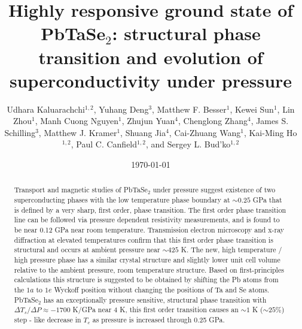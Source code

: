 \documentclass[aps,prb,preprint,groupedaddress,showpacs,amsmath,amssymb]{revtex4}
\begin{document}
\title{Highly responsive ground state of  PbTaSe$_2$: structural phase transition and evolution of superconductivity under pressure}

\author{Udhara Kaluarachchi$^{1,2}$, Yuhang Deng$^3$, Matthew F. Besser$^1$, Kewei Sun$^1$,  Lin Zhou$^1$, Manh Cuong Nguyen$^{1}$,  Zhujun Yuan$^4$, Chenglong Zhang$^4$, James S. Schilling$^3$, Matthew J. Kramer$^1$,  Shuang Jia$^{4}$, Cai-Zhuang Wang$^{1}$, Kai-Ming Ho$^{1,2}$,  Paul C. Canfield$^{1,2}$, and Sergey L. Bud'ko$^{1,2}$ }



\date{\today}

\begin{abstract}

 Transport and magnetic studies of PbTaSe$_2$ under pressure suggest existence of two superconducting phases with the low temperature phase boundary at $\sim 0.25$ GPa  that is defined by a very sharp, first order, phase transition. The first order phase transition line can be followed via pressure dependent resistivity measurements, and is found to be near 0.12 GPa near room temperature. Transmission electron microscopy and x-ray diffraction at elevated temperatures confirm that this first order phase transition is structural and occurs at ambient pressure near $\sim 425$ K. The new, high temperature / high pressure phase has a  similar crystal structure and slightly lower unit cell volume relative to the ambient pressure, room temperature structure.  Based on first-principles calculations this structure is suggested to be obtained by shifting the Pb atoms from the $1a$  to $1e$ Wyckoff position without changing the positions of Ta and Se atoms. PbTaSe$_2$ has an exceptionally pressure sensitive, structural phase transition with $\Delta T_s/\Delta P \approx  - 1700$ K/GPa near 4 K, this first order transition causes an $\sim 1$ K ($\sim 25 \%$) step - like decrease in $T_c$ as pressure is increased through 0.25 GPa.

\end{abstract}

\end{document}
